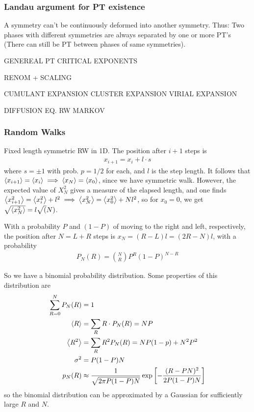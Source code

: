 \documentclass[a4paper, english, 12pt]{article}
\newcommand{\bracket}[1]{\left[ #1 \right]}
\begin{document}
\begin{multicols*}{2}
\subsubsection*{\tiny Landau argument for PT existence}
A symmetry can't be continuously deformed into another symmetry. Thus: Two phases with different symmetries are always separated by one or more PT's (There can still be PT between phases of same symmetries).




GENEREAL PT 
CRITICAL EXPONENTS 

RENOM + SCALING 


CUMULANT EXPANSION 
CLUSTER EXPANSION 
VIRIAL EXPANSION 


DIFFUSION EQ. RW
MARKOV 


\subsubsection*{\scriptsize Random Walks}
Fixed length symmetric RW in 1D. The position after $i+1$ steps is 
\begin{align*}
    x_{i+1} = x_i + l\cdot s 
\end{align*}
where $s=\pm1$ with prob. $p=1/2$ for each, and $l$ is the step length. It follows that $\expval{x_{i+1}}=\expval{x_i}\implies \expval{x_N}=\expval{x_0}$, since we have symmetric walk. However, the expected value of $X_N^2$ gives a measure of the elapsed length, and one finds $\expval{x_{i+1}^2}=\expval{x_i^2}+l^2 \implies \expval{x_N^2}=\expval{x_0^2}+Nl^2$, so for $x_0=0$, we get $\sqrt{\expval{x_N^2}}=l\sqrt(N)$. 

With a probability $P$ and $(1-P)$ of moving to the right and left, respectively, the position after $N=L+R$ steps is $x_N=(R-L)l = (2R-N)l$, with a probability 
\begin{align*}
    P_N(R) = \binom{N}{R} P^R (1-P)^{N-R}
\end{align*}

So we have a binomial probability distribution. Some properties of this distribution are  
\begin{align*}
    \sum_{R=0}^N P_N(R) &= 1 \\ 
    \expval{R} &= \sum_R R\cdot P_N(R)=NP \\ 
    \expval{R^2} &= \sum_R R^2 P_N(R) = NP(1-p) + N^2 P^2 \\
    \sigma^2 &= P(1-P)N \\ 
    p_N(R) &\approx \frac{1}{\sqrt{2\pi P(1-P)N}}\exp\bracket{-\frac{(R-PN)^2}{2P(1-P)N}}
\end{align*}
so the binomial distribution can be approximated by a Gaussian for sufficiently large $R$ and $N$. 


\end{multicols*}
\end{document}
